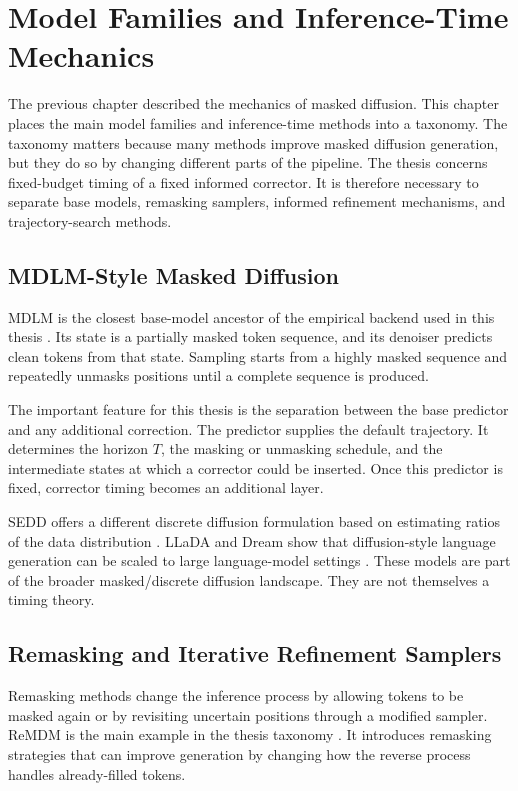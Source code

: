 \chapter{Model Families and Inference-Time Mechanics}
\label{ch:masked-diffusion}

The previous chapter described the mechanics of masked diffusion. This chapter
places the main model families and inference-time methods into a taxonomy. The
taxonomy matters because many methods improve masked diffusion generation, but
they do so by changing different parts of the pipeline. The thesis concerns
fixed-budget timing of a fixed informed corrector. It is therefore necessary to
separate base models, remasking samplers, informed refinement mechanisms, and
trajectory-search methods.

\section{MDLM-Style Masked Diffusion}
\label{sec:ch4-mdlm}

MDLM is the closest base-model ancestor of the empirical backend used in this
thesis \parencite{sahoo2024mdlm}. Its state is a partially masked token
sequence, and its denoiser predicts clean tokens from that state. Sampling
starts from a highly masked sequence and repeatedly unmasks positions until a
complete sequence is produced.

The important feature for this thesis is the separation between the base
predictor and any additional correction. The predictor supplies the default
trajectory. It determines the horizon $T$, the masking or unmasking schedule,
and the intermediate states at which a corrector could be inserted. Once this
predictor is fixed, corrector timing becomes an additional layer.

SEDD offers a different discrete diffusion formulation based on estimating
ratios of the data distribution \parencite{lou2024sedd}. LLaDA and Dream show
that diffusion-style language generation can be scaled to large language-model
settings \parencite{nie2025llada,ye2025dream}. These models are part of the
broader masked/discrete diffusion landscape. They are not themselves a timing
theory.

\section{Remasking and Iterative Refinement Samplers}
\label{sec:ch4-remasking}

Remasking methods change the inference process by allowing tokens to be masked
again or by revisiting uncertain positions through a modified sampler.
ReMDM is the main example in the thesis taxonomy
\parencite{wang2025remdm}. It introduces remasking strategies that can improve
generation by changing how the reverse process handles already-filled tokens.

